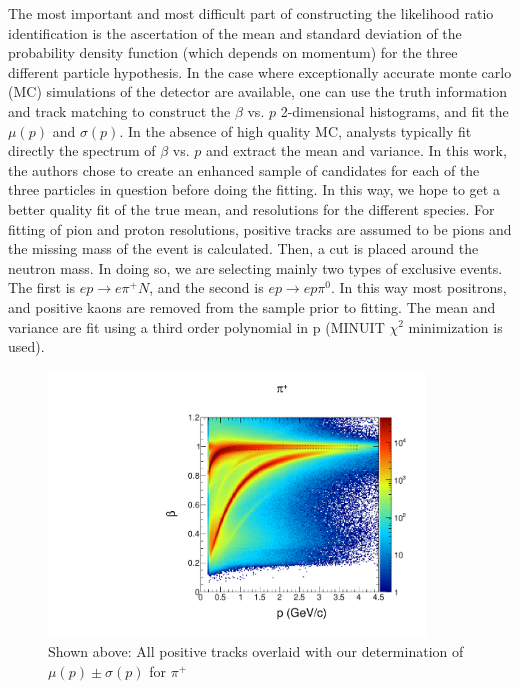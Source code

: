 The most important and most difficult part of constructing the likelihood ratio identification is the ascertation of the mean and standard deviation of the probability density function (which depends on momentum) for the three different particle hypothesis.  In the case where exceptionally accurate monte carlo (MC) simulations of the detector are available, one can use the truth information and track matching to construct the $\beta$ vs. $p$ 2-dimensional histograms, and fit the $\mu(p)$ and $\sigma(p)$.  In the absence of high quality MC, analysts typically fit directly the spectrum of $\beta$ vs. $p$ and extract the mean and variance.  In this work, the authors chose to create an enhanced sample of candidates for each of the three particles in question before doing the fitting.  In this way, we hope to get a better quality fit of the true mean, and resolutions for the different species.  For fitting of pion and proton resolutions, positive tracks are assumed to be pions and the missing mass of the event is calculated.  Then, a cut is placed around the neutron mass.  In doing so, we are selecting mainly two types of exclusive events.  The first is $ep \rightarrow e\pi^+N$, and the second is $ep \rightarrow ep\pi^0$.  In this way most positrons, and positive kaons are removed from the sample prior to fitting.  The mean and variance are fit using a third order polynomial in p (MINUIT $\chi^2$ minimization is used).  

\begin{figure}
  \begin{center}
    \includegraphics[width=10cm]{image/beautiful_pbeta_pip.pdf}
    \caption{ Shown above: All positive tracks overlaid with our determination of $\mu(p) \pm \sigma(p)$ for $\pi^+$}
  \end{center}
\end{figure}

